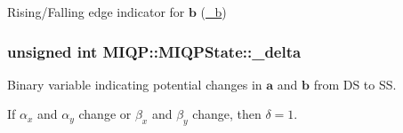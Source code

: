\-Rising/\-Falling edge indicator for $\mathbf{b}$ (\hyperlink{classMIQP_1_1MIQPState_aafa5bce9860b191257cb0166c217e9a3}{\-\_\-b}) \hypertarget{classMIQP_1_1MIQPState_a5083cb38c427382e4d788e7d6b0aab79}{
\subsubsection[{\-\_\-delta}]{\setlength{\rightskip}{0pt plus 5cm}unsigned int {\bf \-M\-I\-Q\-P\-::\-M\-I\-Q\-P\-State\-::\-\_\-delta}}}\label{classMIQP_1_1MIQPState_a5083cb38c427382e4d788e7d6b0aab79}
\-Binary variable indicating potential changes in $\mathbf{a}$ and $\mathbf{b}$ from \-D\-S to \-S\-S.

\-If $\alpha_x$ and $\alpha_y$ change or $\beta_x$ and $\beta_y$ change, then $\delta = 1$.

